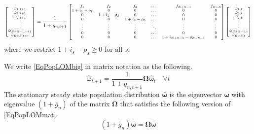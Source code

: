 \documentclass[letterpaper,12pt]{article}
\theoremstyle{definition}
\begin{document}
  \begin{equation}\label{EqPopLOMbig}
    \scriptsize{\begin{bmatrix}
      \hat{\omega}_{1,t+1} \\ \hat{\omega}_{2,t+1} \\ \hat{\omega}_{2,t+1} \\ \vdots \\ \hat{\omega}_{E+S-1,t+1} \\ \hat{\omega}_{E+S,t+1}
    \end{bmatrix} = \frac{1}{1 + g_{n,t+1}}
    \begin{bmatrix}
      f_1 & f_2 & f_3 & \hdots & f_{E+S-1} & f_{E+S} \\
      1+i_1-\rho_1 & 0 & 0 & \hdots & 0 & 0 \\
      0 & 1+i_2-\rho_2 & 0 & \hdots & 0 & 0 \\
      0 & 0 & 1+i_3-\rho_3 & \hdots & 0 & 0 \\
      \vdots & \vdots & \vdots & \ddots & \vdots & \vdots \\
      0 & 0 & 0 & \hdots & 0 & 0 \\
      0 & 0 & 0 & \hdots & 1+i_{E+S-1}-\rho_{E+S-1} & 0
    \end{bmatrix}
    \begin{bmatrix}
      \hat{\omega}_{1,t} \\ \hat{\omega}_{2,t} \\ \hat{\omega}_{2,t} \\ \vdots \\ \hat{\omega}_{E+S-1,t} \\ \hat{\omega}_{E+S,t}
    \end{bmatrix}}
  \end{equation}
  where we restrict $1+i_s-\rho_s\geq 0$ for all $s$.

  We write \eqref{EqPopLOMbig} in matrix notation as the following.
  \begin{equation}\label{EqPopLOMmat}
    \bm{\hat{\omega}}_{t+1} = \frac{1}{1+g_{n,t+1}}\bm{\Omega}\bm{\hat{\omega}}_t \quad\forall t
  \end{equation}
  The stationary steady state population distribution $\bm{\bar{\omega}}$ is the eigenvector $\bm{\omega}$ with eigenvalue $(1+\bar{g}_n)$ of the matrix $\bm{\Omega}$ that satisfies the following version of \eqref{EqPopLOMmat}.
  \begin{equation}\label{EqPopLOMss}
    (1+\bar{g}_n)\bm{\bar{\omega}} = \bm{\Omega}\bm{\bar{\omega}}
  \end{equation}
\end{document}
